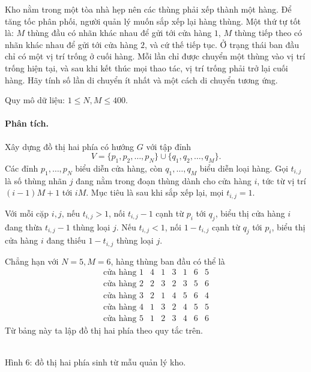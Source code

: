 \documentclass[11pt]{article}
\begin{document}
Kho nằm trong một tòa nhà hẹp nên các thùng phải xếp thành một hàng. Để tăng
tốc phân phối, người quản lý muốn sắp xếp lại hàng thùng. Một thứ tự tốt là:
\(M\) thùng đầu có nhãn khác nhau để gửi tới cửa hàng \(1\), \(M\) thùng tiếp
theo có nhãn khác nhau để gửi tới cửa hàng \(2\), và cứ thế tiếp tục. Ở trạng
thái ban đầu chỉ có một vị trí trống ở cuối hàng. Mỗi lần chỉ được chuyển một
thùng vào vị trí trống hiện tại, và sau khi kết thúc mọi thao tác, vị trí
trống phải trở lại cuối hàng. Hãy tính số lần di chuyển ít nhất và một cách di
chuyển tương ứng.

Quy mô dữ liệu: \(1\le N,M\le 400\).

\paragraph{Phân tích.}
Xây dựng đồ thị hai phía có hướng \(G\) với tập đỉnh
\[
  V=\{p_1,p_2,\ldots,p_N\}\cup\{q_1,q_2,\ldots,q_M\}.
\]
Các đỉnh \(p_1,\ldots,p_N\) biểu diễn cửa hàng, còn
\(q_1,\ldots,q_M\) biểu diễn loại hàng. Gọi \(t_{i,j}\) là số thùng nhãn
\(j\) đang nằm trong đoạn thùng dành cho cửa hàng \(i\), tức từ vị trí
\((i-1)M+1\) tới \(iM\). Mục tiêu là sau khi sắp xếp lại, mọi
\(t_{i,j}=1\).

Với mỗi cặp \(i,j\), nếu \(t_{i,j}>1\), nối \(t_{i,j}-1\) cạnh từ \(p_i\) tới
\(q_j\), biểu thị cửa hàng \(i\) đang thừa \(t_{i,j}-1\) thùng loại \(j\). Nếu
\(t_{i,j}<1\), nối \(1-t_{i,j}\) cạnh từ \(q_j\) tới \(p_i\), biểu thị cửa
hàng \(i\) đang thiếu \(1-t_{i,j}\) thùng loại \(j\).

Chẳng hạn với \(N=5,M=6\), hàng thùng ban đầu có thể là
\[
\begin{array}{c|cccccc}
\text{cửa hàng }1&4&1&3&1&6&5\\
\text{cửa hàng }2&2&3&2&3&5&6\\
\text{cửa hàng }3&2&1&4&5&6&4\\
\text{cửa hàng }4&1&3&2&4&5&5\\
\text{cửa hàng }5&1&2&3&4&6&6
\end{array}
\]
Từ bảng này ta lập đồ thị hai phía theo quy tắc trên.

\begin{center}
\\
\small Hình 6: đồ thị hai phía sinh từ mẫu quản lý kho.
\end{center}
\end{document}
